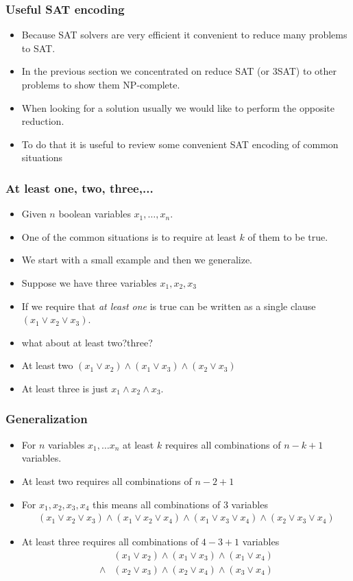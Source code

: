 \documentclass{beamer}
\begin{document}
\begin{frame}
  \frametitle{Useful SAT encoding}
  \begin{itemize}
  \item Because SAT solvers are very efficient it convenient to reduce many problems to SAT. 
  \item In the previous section we concentrated on reduce SAT (or 3SAT) to other problems to show them NP-complete.
  \item When looking for a solution usually we would like to perform the opposite reduction.
  \item To do that it is useful to review some convenient SAT encoding of common situations
  \end{itemize}
\end{frame}
\begin{frame}
  \frametitle{At least one, two, three,...}
  \begin{itemize}
  \item Given $n$ boolean variables $x_1,\ldots, x_n$.
  \item One of the common situations is to require at least $k$ of them to be true.
  \item We start with a small example and then we generalize.
  \item Suppose we have three variables $x_1,x_2,x_3$
  \item If we require that \textit{at least one} is true can be written as a single clause $(x_1\vee x_2\vee x_3)$.
  \item what about at least two?three?
  \item At least two $(x_1\vee x_2)\wedge (x_1\vee x_3)\wedge (x_2\vee x_3)$
  \item At least three is just $x_1\wedge x_2\wedge x_3$.
  \end{itemize}
\end{frame}
\begin{frame}
  \frametitle{Generalization}
  \begin{itemize}
  \item For $n$ variables $x_1,\ldots x_n$ at least $k$ requires all combinations of $n-k+1$ variables.
  \item At least two requires all combinations of $n-2+1$
  \item For $x_1,x_2,x_3,x_4$ this means all combinations of 3 variables
    \begin{align*}
     (x_1\vee x_2\vee x_3)\wedge (x_1\vee x_2\vee x_4)\wedge (x_1\vee x_3\vee x_4)\wedge (x_2\vee x_3\vee x_4) 
    \end{align*}
\item At least three requires all combinations of $4-3+1$ variables
  \begin{align*}
    &(x_1\vee x_2)\wedge (x_1\vee x_3)\wedge (x_1\vee x_4)\\
    \wedge&(x_2\vee x_3)\wedge (x_2\vee x_4)\wedge (x_3\vee x_4)
  \end{align*}
  \end{itemize}
\end{frame}
\end{document}

